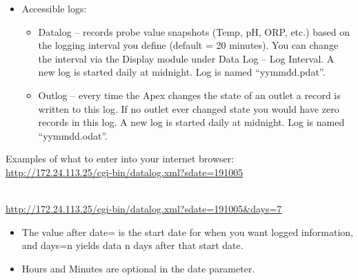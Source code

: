 \documentclass[
]{book}
\providecommand{\tightlist}{%
  \setlength{\itemsep}{0pt}\setlength{\parskip}{0pt}}
\begin{document}
\begin{itemize}
\tightlist
\item
  Accessible logs:

  \begin{itemize}
  \tightlist
  \item
    Datalog -- records probe value snapshots (Temp, pH, ORP, etc.) based on the logging interval you define (default = 20 minutes). You can change the interval via the Display module under Data Log -- Log Interval. A new log is started daily at midnight. Log is named ``yymmdd.pdat''.
  \item
    Outlog -- every time the Apex changes the state of an outlet a record is written to this log. If no outlet ever changed state you would have zero records in this log. A new log is started daily at midnight. Log is named ``yymmdd.odat''.
  \end{itemize}
\end{itemize}

Examples of what to enter into your internet browser:\\
\url{http://172.24.113.25/cgi-bin/datalog.xml?sdate=191005}\strut \\
\url{http://172.24.113.25/cgi-bin/datalog.xml?sdate=191005\&days=7}

\begin{itemize}
\tightlist
\item
  The value after date= is the start date for when you want logged information, and days=n yields data n days after that start date.
\item
  Hours and Minutes are optional in the date parameter.
\end{itemize}
\end{document}
